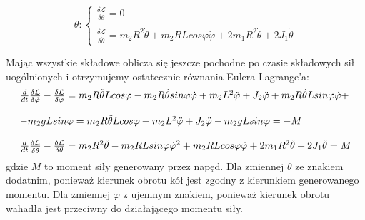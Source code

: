 $$
    \theta:
    \left\{
    \begin{array}{ll}
    \frac{\delta\mathcal{L}}{\delta\theta} = 0 \\ \\
    \frac{\delta\mathcal{L}}{\delta\dot{\theta}} = m_2R^2\dot{\theta} + m_2RLcos\varphi\dot{\varphi} + 2m_1R^2\dot{\theta} + 2J_1\dot{\theta} 
    \end{array}
    \right.
$$

Mając wszystkie składowe oblicza się jeszcze pochodne po czasie składowych sił uogólnionych i otrzymujemy ostatecznie równania Eulera-Lagrange'a:
\begin{equation}
    \begin{array}{ll}
    \frac{d}{dt}\frac{\delta\mathcal{L}}{\delta\dot{\varphi}} - \frac{\delta\mathcal{L}}{\delta\varphi} = m_2R\Ddot{\theta}Lcos\varphi - m_2R\dot{\theta}sin\varphi\dot{\varphi} + m_2L^2\Ddot{\varphi} + J_2\Ddot{\varphi} + m_2R\dot{\theta}Lsin\varphi\dot{\varphi} + \\ \\
    - m_2gLsin\varphi = m_2R\Ddot{\theta}Lcos\varphi + m_2L^2\Ddot{\varphi} + J_2\Ddot{\varphi} - m_2gLsin\varphi = -M
    \\ \\
    \frac{d}{dt}\frac{\delta\mathcal{L}}{\delta\dot{\theta}} - \frac{\delta\mathcal{L}}{\delta\theta} = m_2R^2\Ddot{\theta} - m_2RLsin\varphi\dot{\varphi}^2 + m_2RLcos\varphi\Ddot{\varphi} + 2m_1R^2\Ddot{\theta} + 2J_1\Ddot{\theta} = M
    \end{array}
\end{equation}
%
gdzie $M$ to moment siły generowany przez napęd. Dla zmiennej $\theta$ ze znakiem dodatnim, ponieważ kierunek obrotu kół jest zgodny z kierunkiem generowanego momentu. Dla zmiennej $\varphi$ z ujemnym znakiem, ponieważ kierunek obrotu wahadła jest przeciwny do działającego momentu siły. 

